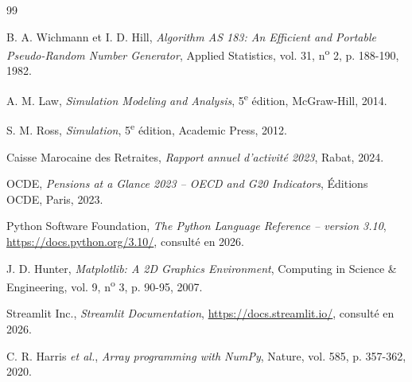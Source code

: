 \documentclass[12pt,a4paper,oneside]{report}
\begin{document}
\begin{thebibliography}{99}

B. A. Wichmann et I. D. Hill, \emph{Algorithm AS 183: An Efficient and
Portable Pseudo-Random Number Generator}, Applied Statistics, vol. 31,
n\textsuperscript{o} 2, p. 188-190, 1982.

A. M. Law, \emph{Simulation Modeling and Analysis}, 5\textsuperscript{e}
édition, McGraw-Hill, 2014.

S. M. Ross, \emph{Simulation}, 5\textsuperscript{e} édition,
Academic Press, 2012.

Caisse Marocaine des Retraites, \emph{Rapport annuel d'activité 2023},
Rabat, 2024.

OCDE, \emph{Pensions at a Glance 2023 -- OECD and G20 Indicators},
Éditions OCDE, Paris, 2023.

Python Software Foundation, \emph{The Python Language Reference --
version 3.10}, \url{https://docs.python.org/3.10/}, consulté en 2026.

J. D. Hunter, \emph{Matplotlib: A 2D Graphics Environment}, Computing in
Science \& Engineering, vol. 9, n\textsuperscript{o} 3, p. 90-95, 2007.

Streamlit Inc., \emph{Streamlit Documentation},
\url{https://docs.streamlit.io/}, consulté en 2026.

C. R. Harris \emph{et al.}, \emph{Array programming with NumPy}, Nature,
vol. 585, p. 357-362, 2020.

\end{thebibliography}
\end{document}
